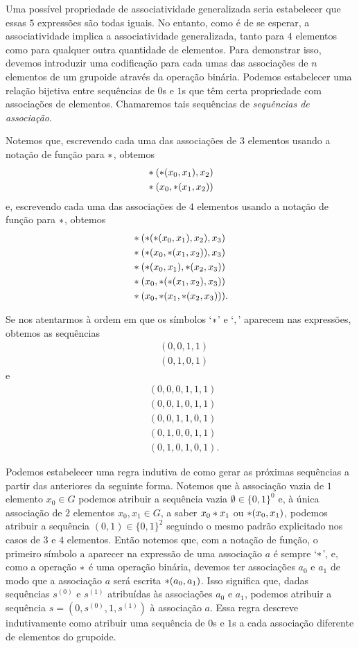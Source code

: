 Uma possível propriedade de associatividade generalizada seria estabelecer que essas $5$ expressões são todas iguais. No entanto, como é de se esperar, a associatividade implica a associatividade generalizada, tanto para $4$ elementos como para qualquer outra quantidade de elementos. Para demonstrar isso, devemos introduzir uma codificação para cada umas das associações de $n$ elementos de um grupoide através da operação binária. Podemos estabelecer uma relação bijetiva entre sequências de $0$s e $1$s que têm certa propriedade com associações de elementos. Chamaremos tais sequências de \textit{sequências de associação}.

Notemos que, escrevendo cada uma das associações de $3$ elementos usando a notação de função para $\ast$, obtemos
	\begin{align*}
	& \ast(\ast(x_0,x_1),x_2) \\
	& \ast(x_0,\ast(x_1,x_2))
	\end{align*}
e, escrevendo cada uma das associações de $4$ elementos usando a notação de função para $\ast$, obtemos
	\begin{align*}
	& \ast(\ast(\ast(x_0,x_1),x_2),x_3) \\
	& \ast(\ast(x_0,\ast(x_1,x_2)),x_3) \\
	& \ast(\ast(x_0,x_1),\ast(x_2,x_3)) \\
	& \ast(x_0,\ast(\ast(x_1,x_2),x_3)) \\
	& \ast(x_0,\ast(x_1,\ast(x_2,x_3))).
	\end{align*}

Se nos atentarmos à ordem em que os símbolos `$\ast$' e `$,$' aparecem nas expressões, obtemos as sequências
	\begin{align*}
	& (0,0,1,1) \\
	& (0,1,0,1)
	\end{align*}
e
	\begin{align*}
	& (0,0,0,1,1,1) \\
	& (0,0,1,0,1,1) \\
	& (0,0,1,1,0,1) \\
	& (0,1,0,0,1,1) \\
	& (0,1,0,1,0,1).
	\end{align*}

Podemos estabelecer uma regra indutiva de como gerar as próximas sequências a partir das anteriores da seguinte forma. Notemos que à associação vazia de $1$ elemento $x_0 \in G$ podemos atribuir a sequência vazia $\emptyset \in \{0,1\}^{0}$ e, à única associação de $2$ elementos $x_0, x_1 \in G$, a saber $x_0 \ast x_1$ ou $\ast(x_0,x_1)$, podemos atribuir a sequência $(0,1) \in \{0,1\}^{2}$ seguindo o mesmo padrão explicitado nos casos de $3$ e $4$ elementos. Então notemos que, com a notação de função, o primeiro símbolo a aparecer na expressão de uma associação $a$ é sempre `$\ast$', e, como a operação $\ast$ é uma operação binária, devemos ter associações $a_0$ e $a_1$ de modo que a associação $a$ será escrita $\ast(a_0,a_1)$. Isso significa que, dadas sequências $s^{(0)}$ e $s^{(1)}$ atribuídas às associações $a_0$ e $a_1$, podemos atribuir a sequência $s = (0,s^{(0)},1,s^{(1)})$ à associação $a$. Essa regra descreve indutivamente como atribuir uma sequência de $0$s e $1$s a cada associação diferente de elementos do grupoide.

